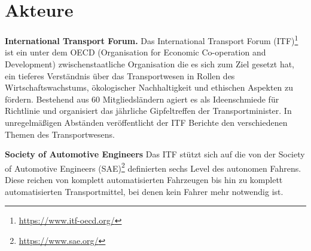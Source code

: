 \section{Akteure}
\label{sec:akteure}

\textbf{International Transport Forum.} Das International Transport Forum (ITF)\footnote{\url{https://www.itf-oecd.org/}} ist ein unter dem OECD (Organisation for Economic Co-operation and Development) zwischenstaatliche Organisation die es sich zum Ziel gesetzt hat, ein tieferes Verständnis über das Transportwesen in Rollen des Wirtschaftswachstums, ökologischer Nachhaltigkeit und ethischen Aspekten zu fördern. Bestehend aus 60 Mitgliedsländern agiert es als Ideenschmiede für Richtlinie und organisiert das jährliche Gipfeltreffen der Transportminister. In unregelmäßigen Abständen veröffentlicht der ITF Berichte den verschiedenen Themen des Transportwesens.

\textbf{Society of Automotive Engineers} \cite{standardSAE}\cite{smith2015automated} Das ITF stützt sich auf die von der Society of Automotive Engineers (SAE)\footnote{\url{https://www.sae.org/}}  definierten sechs Level des autonomen Fahrens. Diese reichen von komplett automatisierten Fahrzeugen bis hin zu komplett automatisierten Transportmittel, bei denen kein Fahrer mehr notwendig ist.\\